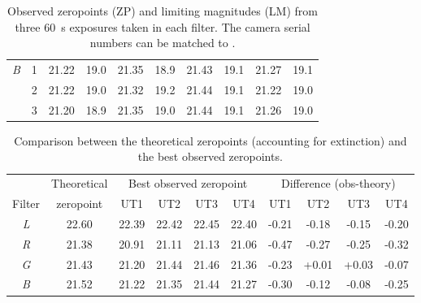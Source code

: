 \begin{colsection}
\begin{table}[p]
\begin{center}
\begin{tabular}{cc|cc|cc|cc|cc}
            \textit{B} & 1 &
            21.22 & 19.0 &
            21.35 & 18.9 &
            21.43 & 19.1 &
            21.27 & 19.1
            \\
            & 2 &
            21.22 & 19.0 &
            21.32 & 19.2 &
            21.44 & 19.1 &
            21.22 & 19.0
            \\
            & 3 &
            21.20 & 18.9 &
            21.35 & 19.0 &
            21.44 & 19.1 &
            21.26 & 19.0
            \\
        \end{tabular}
    \end{center}
    \caption[Observed zeropoints and limiting magnitudes]{
        Observed zeropoints (ZP)  and limiting magnitudes (LM)  from three \SI{60}{\second} exposures taken in each filter. The camera serial numbers can be matched to .
    }\label{tab:zps_lms}
\end{table}

\begin{table}[p]
    \begin{center}
        \begin{tabular}{c|c|cccc|cccc} %
             &
            Theoretical &
            \multicolumn{4}{c|}{Best observed zeropoint} &
            \multicolumn{4}{c}{Difference (obs-theory)}
            \\
            Filter & zeropoint & UT1 & UT2 & UT3 & UT4 & UT1 & UT2 & UT3 & UT4 \\
            \midrule
            \textit{L} & 22.60 & 22.39 & 22.42 & 22.45 & 22.40 & -0.21 & -0.18 & -0.15 & -0.20 \\
            \textit{R} & 21.38 & 20.91 & 21.11 & 21.13 & 21.06 & -0.47 & -0.27 & -0.25 & -0.32 \\
            \textit{G} & 21.43 & 21.20 & 21.44 & 21.46 & 21.36 & -0.23 & +0.01 & +0.03 & -0.07 \\
            \textit{B} & 21.52 & 21.22 & 21.35 & 21.44 & 21.27 & -0.30 & -0.12 & -0.08 & -0.25 \\
        \end{tabular}
    \end{center}
    \caption[Comparison between theoretical and observed zeropoints]{
        Comparison between the theoretical zeropoints (accounting for extinction) and the best observed zeropoints.
    }\label{tab:zps_comparison}
\end{table}


\end{colsection}
